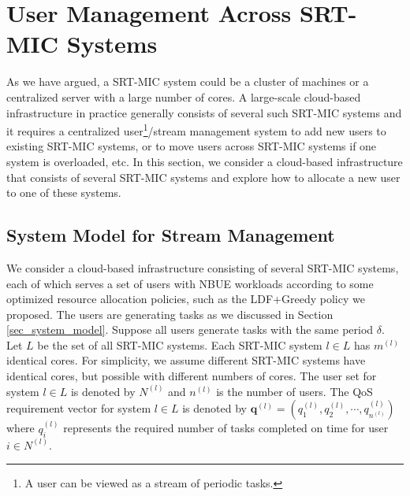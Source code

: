 \documentclass[prodmode,acmtompecs]{acmsmall}
\newcommand{\reqvec}{\mathbf{q}}
\newcommand{\reqscalar}{q}
\newcommand{\fullUserSet}{N}
\newcommand{\myComments}[1]{}
\newif\ifdissertation
\newif\ifhuawei
\newcommand{\dissertationStart}{\ifdissertation  \myComments{Dissertation version: }}
\newcommand{\huaweiStart}{\ifhuawei  \myComments{Huawei version: }}
\newcommand{\commentEnd}{\myComments{End}}
\begin{document}
\huaweiStart
\section*{Acknowledgment}
This research was supported by Huawei Technologies Co. Ltd. 
The authors would like to thank Alan Gatherer, Zheng Lu, Haishan Zhu and Mattan Erez for their comments and feedbacks on this work. 
\commentEnd\fi

{}



\dissertationStart
\section{User Management Across SRT-MIC  Systems}
\myComments{Improve this based on prof's feedbacks. }
As we have argued, a SRT-MIC  system could be a cluster of machines or a centralized server with a large number of cores. A large-scale cloud-based infrastructure in practice generally consists of several such SRT-MIC  systems and it requires a centralized user\footnote{A user can be viewed as a stream of periodic tasks. }/stream management system to add new users to existing SRT-MIC  systems, or to move users across SRT-MIC  systems if one system is overloaded, etc. In this section, we consider a cloud-based infrastructure that consists of several SRT-MIC systems and explore how to allocate a new user to one of these systems. 

\subsection{System Model for Stream Management}
We consider a cloud-based infrastructure consisting of several SRT-MIC systems, each of which serves a set of users with NBUE workloads according to some optimized resource allocation policies, such as the LDF+Greedy policy we proposed. The users are generating tasks as we discussed in Section \ref{sec_system_model}. 
Suppose all users generate tasks with the same period $\delta$. Let $L$ be the set of all SRT-MIC systems. Each SRT-MIC system $l \in L$ has $m^{(l)}$ identical cores. For simplicity, we assume different SRT-MIC systems have identical cores, but possible with different numbers of cores. The user set for system $l \in L$ is denoted by $\fullUserSet^{(l)}$ and $n^{(l)}$ is the number of users. The QoS requirement vector for system $l \in L$ is denoted by $\reqvec^{(l)} = (\reqscalar_1^{(l)}, \reqscalar_2^{(l)}, \cdots, \reqscalar_{n^{(l)}}^{(l)})$ where $\reqscalar_i^{(l)}$ represents the required number of tasks completed on time for user $i \in N^{(l)}$. 
\end{document}
